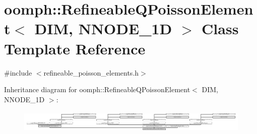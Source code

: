 \hypertarget{classoomph_1_1RefineableQPoissonElement}{}\section{oomph\+:\+:Refineable\+Q\+Poisson\+Element$<$ D\+IM, N\+N\+O\+D\+E\+\_\+1D $>$ Class Template Reference}
\label{classoomph_1_1RefineableQPoissonElement}


{\ttfamily \#include $<$refineable\+\_\+poisson\+\_\+elements.\+h$>$}

Inheritance diagram for oomph\+:\+:Refineable\+Q\+Poisson\+Element$<$ D\+IM, N\+N\+O\+D\+E\+\_\+1D $>$\+:\begin{figure}[H]
\begin{center}
\leavevmode
\includegraphics[height=1.082126cm]{classoomph_1_1RefineableQPoissonElement}
\end{center}
\end{figure}
